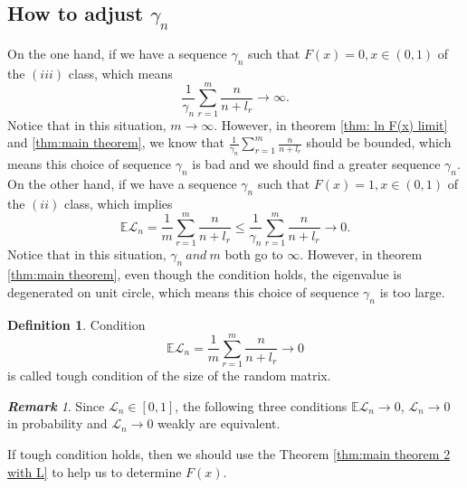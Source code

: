 \documentclass[12pt]{article}
\theoremstyle{plain}
\theoremstyle{definition}
\newtheorem{dfn}{\textbf{Definition}}
\theoremstyle{remark}
\newtheorem{rem}{\textbf{Remark}}
\begin{document}
\subsection*{How to adjust $\gamma_n$}
On the one hand, if we have a sequence $\gamma_{n}$ such that $F(x)=0,x\in(0,1)$ of the $(iii)$ class, which means 
\begin{equation*}
\frac{1}{\gamma_{n}} \sum_{r=1}^{m} \frac{n}{n+l_{r}} \rightarrow \infty.
\end{equation*}
Notice that in this situation, $m\rightarrow \infty$.
However, in theorem \ref{thm: ln F(x) limit} and \ref{thm:main theorem}, we know that $\frac{1}{\gamma_{n}} \sum_{r=1}^{m} \frac{n}{n+l_{r}}$ should be bounded, which means this choice of sequence $\gamma_{n}$ is bad and we should find a greater sequence $\gamma_{n}$.\\
On the other hand, if we have a sequence $\gamma_{n}$ such that $F(x)=1,x\in(0,1)$ of the $(ii)$ class, which implies
\begin{equation*}
	\mathbb{E} \mathscr{L}_{n}=\frac{1}{m} \sum_{r=1}^{m} \frac{n}{n+l_{r}}\leq \frac{1}{\gamma_{n}} \sum_{r=1}^{m} \frac{n}{n+l_{r}} \rightarrow  0.
\end{equation*}
Notice that in this situation, $\gamma_{n}\ and\  m$ both go to $\infty$.
However, in theorem \ref{thm:main theorem}, even though the condition holds, the eigenvalue is degenerated on unit circle, which means this choice of sequence $\gamma_{n}$ is too large.

\begin{dfn}
	Condition 
	\begin{equation*}
		\mathbb{E} \mathscr{L}_{n}=\frac{1}{m} \sum_{r=1}^{m} \frac{n}{n+l_{r}} \rightarrow 0
	\end{equation*}
	is called tough condition of the size of the random matrix.
\end{dfn}
\begin{rem}
	Since $\mathscr{L}_{n}\in [0,1]$, the following three conditions $\mathbb{E} \mathscr{L}_{n}\rightarrow 0$, $ \mathscr{L}_{n}\rightarrow 0$ in probability and $ \mathscr{L}_{n}\rightarrow 0$ weakly are equivalent.
\end{rem}
If tough condition holds, then we should use the Theorem \ref{thm:main theorem 2 with L} to help us to determine $F(x)$.



\end{document}
